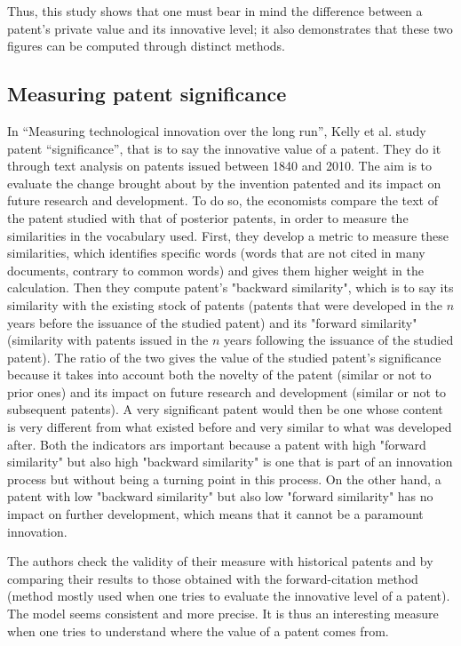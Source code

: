 \documentclass[12pt]{article}
\begin{document}
Thus, this study shows that one must bear in mind the difference between a patent’s private value and its innovative level; it also demonstrates that these two figures can be computed through distinct methods. 

\subsection{Measuring patent significance}
In “Measuring technological innovation over the long run”, Kelly et al. study patent “significance”, that is to say the innovative value of a patent. They do it through text analysis on patents issued between 1840 and 2010. The aim is to evaluate the change brought about by the invention patented and its impact on future research and development. To do so, the economists compare the text of the patent studied with that of posterior patents, in order to measure the similarities in the vocabulary used. First, they develop a metric to measure these similarities, which identifies specific words (words that are not cited in many documents, contrary to common words) and gives them higher weight in the calculation. Then they compute patent's "backward similarity", which is to say its similarity with the existing stock of patents (patents that were developed in the $n$ years before the issuance of the studied patent) and its "forward similarity" (similarity with patents issued in the $n$ years following the issuance of the studied patent). The ratio of the two gives the value of the studied patent's significance because it takes into account both the novelty of the patent (similar or not to prior ones) and its impact on future research and development (similar or not to subsequent patents). A very significant patent would then be one whose content is very different from what existed before and very similar to what was developed after. Both the indicators ars important because a patent with high "forward similarity" but also high "backward similarity" is one that is part of an innovation process but without being a turning point in this process. On the other hand, a patent with low "backward similarity" but also low "forward similarity" has no impact on further development, which means that it cannot be a paramount innovation. 

The authors check the validity of their measure with historical patents and by comparing their results to those obtained with the forward-citation method (method mostly used when one tries to evaluate the innovative level of a patent). The model seems consistent and more precise. It is thus an interesting measure when one tries to understand where the value of a patent comes from. 
\end{document}
